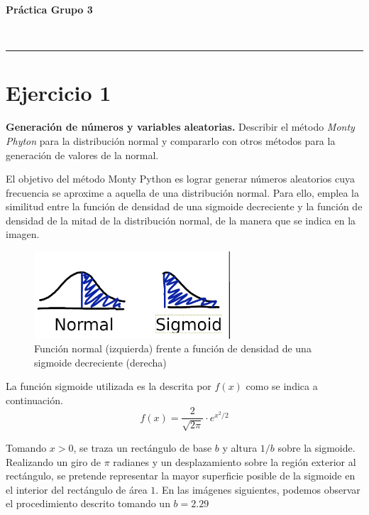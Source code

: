 \documentclass[a4paper,12pt]{article}
\begin{document}
	
	\setlength{\parindent}{0.5cm}
	\setlength{\voffset}{-2cm}
	\setlength{\hoffset}{-2cm}
	
	\begin{center}
		\begin{LARGE}
			\textbf{Práctica Grupo 3}
		\end{LARGE}
		\begin{Large}
			\\ \medskip {}
		\end{Large}
		\rule{14cm}{0.5mm}
	\end{center}
	
	
	\tableofcontents
	
	\newpage
	\section*{Ejercicio 1}
	\textbf{Generación de números y variables aleatorias.} Describir el método \textit{Monty Phyton} para la distribución normal y compararlo con otros métodos para la
generación de valores de la normal.
	
	El objetivo del método Monty Python es lograr generar números aleatorios cuya frecuencia se aproxime a aquella de una distribución normal. 
	Para ello, emplea la similitud entre la función de densidad de una sigmoide decreciente y la función de densidad de la mitad de la distribución normal, de la manera que se indica en la imagen.
	
	\begin{figure}[H]
		\centering
		\includegraphics[width=0.65\textwidth]{include/normal_vs_sigmoid.png}
		\caption{Función normal (izquierda) frente a función de densidad de una sigmoide decreciente (derecha)}
	\end{figure}
	
	La función sigmoide utilizada es la descrita por $f(x)$ como se indica a continuación.
	$$f(x) = \dfrac{2}{\sqrt{2\pi}} \cdot e^{x^2/2} $$
	
	Tomando $x>0$, se traza un rectángulo de base $b$ y altura $1/b$ sobre la sigmoide. Realizando un giro de $\pi$ radianes y un desplazamiento sobre la región exterior al rectángulo, se pretende representar la mayor superficie posible de la sigmoide en el interior del rectángulo de área $1$. En las imágenes siguientes, podemos observar el procedimiento descrito tomando un $b=2.29$
	
\end{document}
